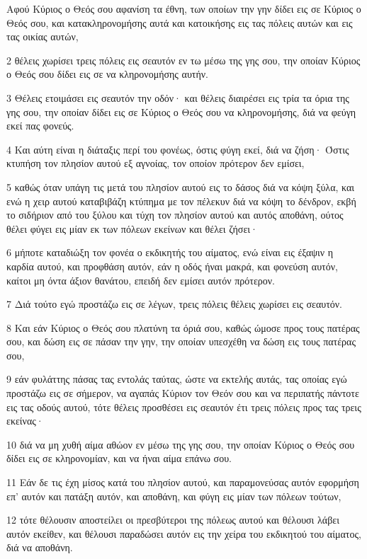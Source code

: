 \par Αφού Κύριος ο Θεός σου αφανίση τα έθνη, των οποίων την γην δίδει εις σε Κύριος ο Θεός σου, και κατακληρονομήσης αυτά και κατοικήσης εις τας πόλεις αυτών και εις τας οικίας αυτών,
\par 2 θέλεις χωρίσει τρεις πόλεις εις σεαυτόν εν τω μέσω της γης σου, την οποίαν Κύριος ο Θεός σου δίδει εις σε να κληρονομήσης αυτήν.
\par 3 Θέλεις ετοιμάσει εις σεαυτόν την οδόν· και θέλεις διαιρέσει εις τρία τα όρια της γης σου, την οποίαν δίδει εις σε Κύριος ο Θεός σου να κληρονομήσης, διά να φεύγη εκεί πας φονεύς.
\par 4 Και αύτη είναι η διάταξις περί του φονέως, όστις φύγη εκεί, διά να ζήση· Όστις κτυπήση τον πλησίον αυτού εξ αγνοίας, τον οποίον πρότερον δεν εμίσει,
\par 5 καθώς όταν υπάγη τις μετά του πλησίον αυτού εις το δάσος διά να κόψη ξύλα, και ενώ η χειρ αυτού καταβιβάζη κτύπημα με τον πέλεκυν διά να κόψη το δένδρον, εκβή το σιδήριον από του ξύλου και τύχη τον πλησίον αυτού και αυτός αποθάνη, ούτος θέλει φύγει εις μίαν εκ των πόλεων εκείνων και θέλει ζήσει·
\par 6 μήποτε καταδιώξη τον φονέα ο εκδικητής του αίματος, ενώ είναι εις έξαψιν η καρδία αυτού, και προφθάση αυτόν, εάν η οδός ήναι μακρά, και φονεύση αυτόν, καίτοι μη όντα άξιον θανάτου, επειδή δεν εμίσει αυτόν πρότερον.
\par 7 Διά τούτο εγώ προστάζω εις σε λέγων, τρεις πόλεις θέλεις χωρίσει εις σεαυτόν.
\par 8 Και εάν Κύριος ο Θεός σου πλατύνη τα όριά σου, καθώς ώμοσε προς τους πατέρας σου, και δώση εις σε πάσαν την γην, την οποίαν υπεσχέθη να δώση εις τους πατέρας σου,
\par 9 εάν φυλάττης πάσας τας εντολάς ταύτας, ώστε να εκτελής αυτάς, τας οποίας εγώ προστάζω εις σε σήμερον, να αγαπάς Κύριον τον Θεόν σου και να περιπατής πάντοτε εις τας οδούς αυτού, τότε θέλεις προσθέσει εις σεαυτόν έτι τρεις πόλεις προς τας τρεις εκείνας·
\par 10 διά να μη χυθή αίμα αθώον εν μέσω της γης σου, την οποίαν Κύριος ο Θεός σου δίδει εις σε κληρονομίαν, και να ήναι αίμα επάνω σου.
\par 11 Εάν δε τις έχη μίσος κατά του πλησίον αυτού, και παραμονεύσας αυτόν εφορμήση επ' αυτόν και πατάξη αυτόν, και αποθάνη, και φύγη εις μίαν των πόλεων τούτων,
\par 12 τότε θέλουσιν αποστείλει οι πρεσβύτεροι της πόλεως αυτού και θέλουσι λάβει αυτόν εκείθεν, και θέλουσι παραδώσει αυτόν εις την χείρα του εκδικητού του αίματος, διά να αποθάνη.
